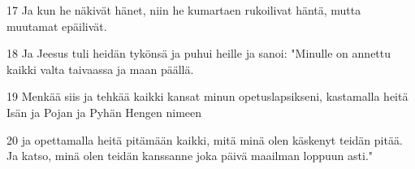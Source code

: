 \par 17 Ja kun he näkivät hänet, niin he kumartaen rukoilivat häntä, mutta muutamat epäilivät.
\par 18 Ja Jeesus tuli heidän tykönsä ja puhui heille ja sanoi: "Minulle on annettu kaikki valta taivaassa ja maan päällä.
\par 19 Menkää siis ja tehkää kaikki kansat minun opetuslapsikseni, kastamalla heitä Isän ja Pojan ja Pyhän Hengen nimeen
\par 20 ja opettamalla heitä pitämään kaikki, mitä minä olen käskenyt teidän pitää. Ja katso, minä olen teidän kanssanne joka päivä maailman loppuun asti."


